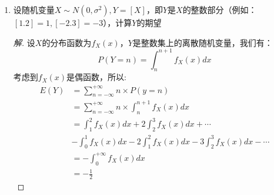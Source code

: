 \documentclass[12pt]{article}
\newcommand{\hei}{\CJKfamily{hei}}                          %
\begin{document}
\begin{enumerate}
\begin{proof}[解]
	$k$次操作后$R$罐的红球数目满足：
	\begin{equation}
	X=R_1+R_2+\cdots+R_n,\quad R_t=\left\{
	\begin{array}{cc}
	1 & \mbox{第$t$个红球仍在$R$罐}\\
	0 & \mbox{第$t$对夫妇不在$R$罐}
	\end{array}
	\right.
	\end{equation}
	对于操作开始前$R$罐中原有的每一个红球而言，其经过$k$次操作仍回到$R$罐意味着被选中的次数为偶数(从来未被选中意味着选中次数为0，仍为偶数)。所以：
	\begin{equation}
	P(R_t=1)=1-P(R_t=0)=\sum_{m=2i}\binom{k}{m}\left(\frac{1}{n}\right)^m\left(1-\frac{1}{n}\right)^{k-m}
	\end{equation}
	根据二项式定理，我们可以计算出偶数次项的和可以计算如下：
	\begin{equation}
	\sum_{m=2i}\binom{k}{m}a^mb^{k-m}=\frac{1}{2}\left(\left(b+a\right)^k+\left(b-a\right)^k\right)
	\end{equation}
	所以：
	\begin{equation}\begin{aligned}
	P(R_t=1)&=\frac{1}{2}\left(\left(1-\frac{1}{n}+\frac{1}{n}\right)^k+\left(1-\frac{1}{n}-\frac{1}{n}\right)^k\right) \\
	&=\frac{1}{2}\left(1+\left(1-\frac{2}{n}\right)^k\right) 
	\end{aligned}
	\end{equation}
	从而
	\begin{equation}
	\begin{aligned}
	E(X)&=E(R_1+R_2+\cdots+R_n) \\
	&=E(R_1)+E(R_2)+\cdots+E(R_n) \\
	&=\frac{n}{2}\left(1+\left(1-\frac{2}{n}\right)^k\right)
	\end{aligned}
	\end{equation}
\end{proof}

\item {\hei 设随机变量$X\sim N(0,\sigma^2),Y=[X]$，即$Y$是$X$的整数部分（例如：$[1.2]=1,[-2.3]=-3$），计算$Y$的期望}
\begin{proof}[解]
	设$X$的分布函数为$f_X(x)$，$Y$是整数集上的离散随机变量，我们有：
	\begin{equation}
	P(Y=n)=\int_{n}^{n+1}f_X(x)dx
	\end{equation}
	考虑到$f_X(x)$是偶函数，所以:
	\begin{equation}
	\begin{aligned}
	E(Y)&=\sum_{n=-\infty}^{+\infty}n\times P(y=n) \\
	&=\sum_{n=-\infty}^{+\infty}n\times\int_{n}^{n+1}f_X(x)dx \\
	&=\int_{1}^{2}f_X(x)dx+2\int_{2}^{3}f_X(x)dx+\cdots\\
	&-\int_{0}^{1}f_X(x)dx-2\int_{1}^{2}f_X(x)dx-3\int_{2}^{3}f_X(x)dx-\cdots \\
	&=-\int_{0}^{+\infty}f_X(x)dx \\
	&=-\frac{1}{2}
	\end{aligned}
	\end{equation}
\end{proof}


\end{enumerate}
\end{document}
